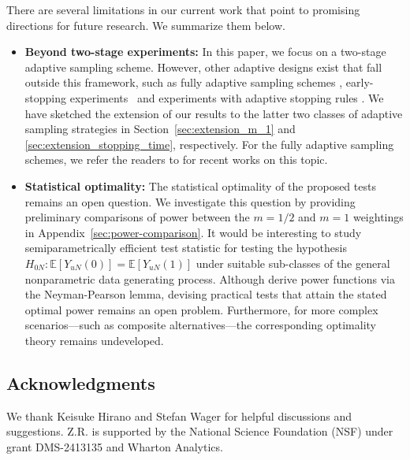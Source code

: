 \documentclass[12pt]{article}
\newcommand{\E}{\mathbb E}								%
\begin{document}
There are several limitations in our current work that point to promising directions for future research. We summarize them below.

\begin{itemize}
	
	\item \textbf{Beyond two-stage experiments:} In this paper, we focus on a two-stage adaptive sampling scheme. However, other adaptive designs exist that fall outside this framework, such as fully adaptive sampling schemes \citep{lai1985asymptotically}, early-stopping experiments~\citep{sampson2005drop,sill2009drop} and experiments with adaptive stopping rules \citep{bauer1994evaluation}. We have sketched the extension of our results to the latter two classes of adaptive sampling strategies in Section~\ref{sec:extension_m_1} and \ref{sec:extension_stopping_time}, respectively. For the fully adaptive sampling schemes, we refer the readers to \citet{khamaru2024inference,han2024ucb,ren2024lai} for recent works on this topic. 
	
	\item \textbf{Statistical optimality:} The statistical optimality of the proposed tests remains an open question. We investigate this question by  providing preliminary comparisons of power between the $m = 1/2$ and $m = 1$ weightings in Appendix~\ref{sec:power-comparison}. It would be interesting to study semiparametrically efficient test statistic for testing the hypothesis $H_{0N}:\E[Y_{uN}(0)] = \E[Y_{uN}(1)]$ under suitable sub-classes of the general nonparametric data generating process. Although \citet{Hirano2023,adusumilli2023optimal} derive power functions via the Neyman-Pearson lemma, devising practical tests that attain the stated optimal power remains an open problem. Furthermore, for more complex scenarios—such as composite alternatives—the corresponding optimality theory remains undeveloped. 
\end{itemize}

\subsection*{Acknowledgments}
We thank Keisuke Hirano and Stefan Wager for helpful discussions and suggestions. Z.R. is supported by the National Science Foundation (NSF) under grant DMS-2413135 and 
Wharton Analytics.


\printbibliography

\clearpage

\appendix
\end{document}
